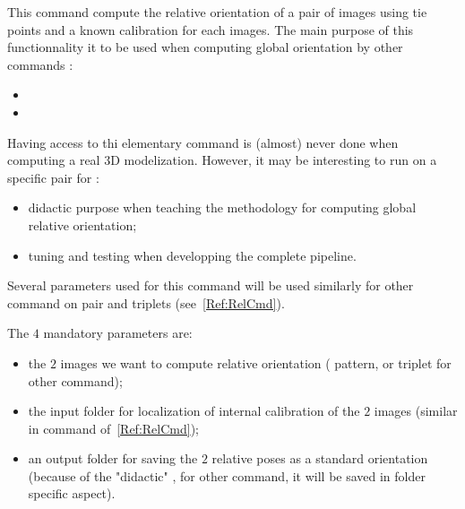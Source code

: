 \documentclass[a4paper]{article}
\begin{document}
\CmdTitle

\tableofcontents



\SecDescr

This command  compute the relative orientation of a pair of images
using tie points and a known calibration for each images.
The main purpose of this functionnality it to be used
when computing  global orientation   by  other commands :

\begin{itemize}
    \item {} 
    \item {}
\end{itemize}

Having access to thi elementary command is (almost) never done when
computing a real 3D modelization.
However, it  may be interesting to run on a specific pair for :


\begin{itemize}
   \item didactic purpose when teaching the methodology for computing global
         relative orientation;

   \item tuning and testing when developping the complete pipeline.

\end{itemize}


Several parameters used for  this command will be used similarly for  other
command on pair and triplets (see~\ref{Ref:RelCmd}).

The $4$ mandatory parameters are:

\begin{itemize}
  \item the $2$ images we want to compute relative orientation ( pattern, or triplet for other command);

  \item the input folder for localization of internal calibration of the $2$ images (similar in command of~\ref{Ref:RelCmd});

  \item an output folder for saving the $2$ relative poses as a standard orientation
       (because of the "didactic" , for other command, it will be saved in folder specific 
        aspect).
\end{itemize}
\end{document}
